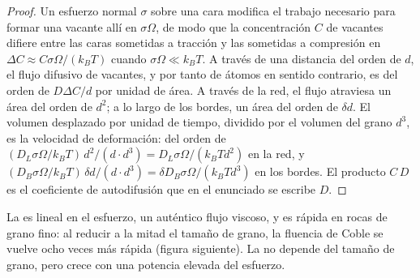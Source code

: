 \begin{proof}
Un esfuerzo normal $\sigma$ sobre una cara modifica el trabajo necesario para formar una vacante
allí en $\sigma\Omega$, de modo que la concentración $C$ de vacantes difiere entre
las caras sometidas a tracción y las sometidas a compresión en $\Delta C \approx C\sigma\Omega/
(k_BT)$ cuando $\sigma\Omega \ll k_BT$. A través de una distancia del orden de $d$, el
flujo difusivo de vacantes, y por tanto de átomos en sentido contrario, es del orden de $D\Delta
C/d$ por unidad de área. A través de la red, el flujo atraviesa un área del orden de
$d^2$; a lo largo de los bordes, un área del orden de $\delta d$. El volumen desplazado por
unidad de tiempo, dividido por el volumen del grano $d^3$, es la velocidad de deformación: del orden de
$(D_L\sigma\Omega/k_BT)\,d^2/(d\cdot d^3) = D_L\sigma\Omega/(k_BTd^2)$ en la
red, y $(D_B\sigma\Omega/k_BT)\,\delta d/(d\cdot d^3) = \delta D_B
\sigma\Omega/(k_BTd^3)$ en los bordes. El producto $C\,D$ es el
coeficiente de autodifusión que en el enunciado se escribe $D$.
\end{proof}

La  es lineal en el esfuerzo, un auténtico flujo viscoso, y es rápida en
rocas de grano fino: al reducir a la mitad el tamaño de grano, la fluencia de Coble se vuelve
ocho veces más rápida (figura siguiente). La  no depende del tamaño
de grano, pero crece con una potencia elevada del esfuerzo.

